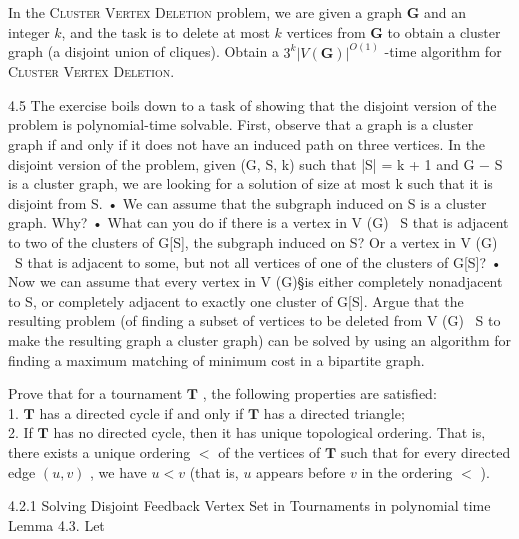 \documentclass[11pt]{exam}
\begin{document}
\begin{questions}
\question In the \textsc{Cluster Vertex Deletion} problem, we are given a graph $\pmb{G}$ and an integer $k$, and the
task is to delete at most $k$ vertices from $\pmb{G}$ to obtain a cluster graph (a disjoint union of cliques).
    Obtain a $3^k|V(\pmb{G})|^{O(1)}$ -time algorithm for \textsc{Cluster Vertex Deletion}.
\begin{solution}
    4.5 The exercise boils down to a task of showing that the disjoint version of the problem
is polynomial-time solvable.
First, observe that a graph is a cluster graph if and only if it does not have an induced
path on three vertices. In the disjoint version of the problem, given (G, S, k) such that
|S| = k + 1 and G − S is a cluster graph, we are looking for a solution of size at most k
such that it is disjoint from S.
• We can assume that the subgraph induced on S is a cluster graph. Why?
• What can you do if there is a vertex in V (G) \ S that is adjacent to two of the clusters
of G[S], the subgraph induced on S? Or a vertex in V (G) \ S that is adjacent to some,
but not all vertices of one of the clusters of G[S]?
• Now we can assume that every vertex in V (G)\S is either completely nonadjacent to S,
or completely adjacent to exactly one cluster of G[S]. Argue that the resulting problem
(of finding a subset of vertices to be deleted from V (G) \ S to make the resulting graph
a cluster graph) can be solved by using an algorithm for finding a maximum matching
of minimum cost in a bipartite graph.
\end{solution}

\question Prove that for a tournament $\pmb{T}$ , the following properties are satisfied:\\
1. $\pmb{T}$ has a directed cycle if and only if $\pmb{T}$ has a directed triangle;\\
2. If $\pmb{T}$ has no directed cycle, then it has unique topological ordering. That is, there exists a unique ordering $<$ of the vertices of $\pmb{T}$ such that for every directed edge $(u, v)$ , we have
$u < v$ (that is, $u$ appears before $v$ in the ordering $<$ ).
\begin{solution}
    4.2.1 Solving Disjoint Feedback Vertex Set in Tournaments in polynomial time\\
    Lemma 4.3. Let
\end{solution}


\end{questions}
\end{document}
